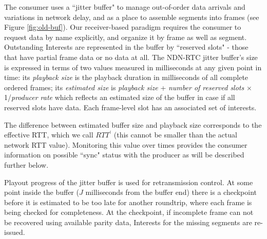 \documentclass{icn/sig-alternate-2013} %
\newcommand{\ndnrtcName}{NDN-RTC} %
\begin{document}
The consumer uses a ``jitter buffer" to manage out-of-order data arrivals and variations in network delay, and as a place to assemble segments into frames (see Figure \ref{fig:old-buf}). %
Our receiver-based paradigm requires the consumer to request data by name explicitly, and organize it by frame as well as segment. %
Outstanding Interests are represented in the buffer by ``reserved slots" - those that have partial frame data or no data at all.
The \ndnrtcName{} jitter buffer's size is expressed in terms of two values measured in milliseconds at any given point in time: its \textit{playback size} is the playback duration in milliseconds of all complete ordered frames; its \textit{estimated size} is \textit{playback size} + \textit{number of reserved slots} $\times$ 1/\textit{producer rate} which reflects an estimated size of the buffer in case if all reserved slots have data.  Each frame-level slot has an associated set of interests. 

The difference between estimated buffer size and playback size corresponds to the effective RTT, which we call $RTT^{\prime}$ (this cannot be smaller than the actual network RTT value). %
Monitoring this value over times provides the consumer information on possible ``sync" status with the producer as will be described further below. %

Playout progress of the jitter buffer is used for retransmission control. %
At some point inside the buffer ($J$ milliseconds from the buffer end) there is a checkpoint before it is estimated to be too late for another roundtrip, where each frame is being checked for completeness. At the checkpoint, if incomplete frame can not be recovered using available parity data, Interests for the missing segments are re-issued. 
\end{document}
